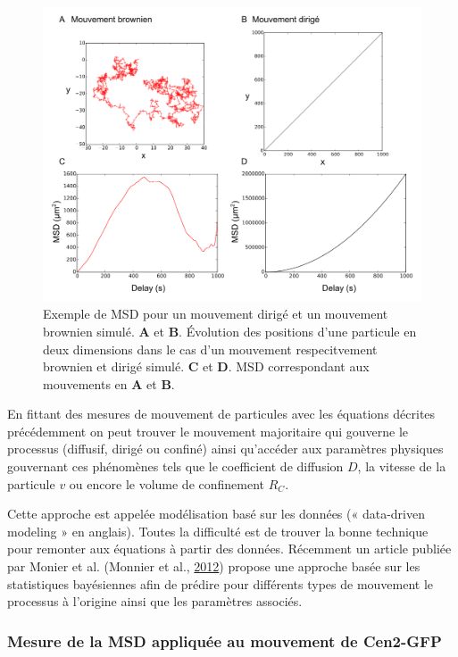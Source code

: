 \documentclass[12pt,a4paper,twoside,openright]{book}
\begin{document}
\begin{figure}[htbp]
\centering
\includegraphics{figures/results/imaging/motions.png}
\caption[Exemple de MSD pour un mouvement dirigé et un mouvement brownien simulé]{\label{fig:motions}Exemple
de MSD pour un mouvement dirigé et un mouvement brownien simulé.
\textbf{A} et \textbf{B}. Évolution des positions d'une particule en
deux dimensions dans le cas d'un mouvement respecitvement brownien et
dirigé simulé. \textbf{C} et \textbf{D}. MSD correspondant aux
mouvements en \textbf{A} et \textbf{B}.}
\end{figure}

En fittant des mesures de mouvement de particules avec les équations
décrites précédemment on peut trouver le mouvement majoritaire qui
gouverne le processus (diffusif, dirigé ou confiné) ainsi qu'accéder aux
paramètres physiques gouvernant ces phénomènes tels que le coefficient
de diffusion \(D\), la vitesse de la particule \(v\) ou encore le volume
de confinement \(R_C\).

Cette approche est appelée modélisation basé sur les données («
data-driven modeling » en anglais). Toutes la difficulté est de trouver
la bonne technique pour remonter aux équations à partir des données.
Récemment un article publiée par Monier et al. (Monnier et al.,
\hyperref[ref-Monnier2012]{2012}) propose une approche basée sur les
statistiques bayésiennes afin de prédire pour différents types de
mouvement le processus à l'origine ainsi que les paramètres associés.

\subsubsection{Mesure de la MSD appliquée au mouvement de
Cen2-GFP}\label{mesure-de-la-msd-appliquuxe9e-au-mouvement-de-cen2-gfp}
\end{document}
